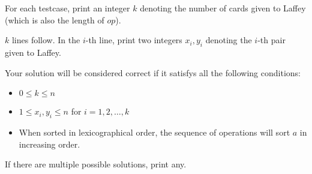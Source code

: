 For each testcase, print an integer $k$ denoting the number of cards given to Laffey (which is also the length of $op$).

$k$ lines follow.
In the $i$-th line, print two integers $x_i,y_i$ denoting the $i$-th pair given to Laffey.

Your solution will be considered correct if it satisfys all the following conditions:
\begin{itemize}
    \item $0 \leq k \leq n$
    \item $1 \leq x_i,y_i \leq n$ for $i = 1,2,\ldots,k$
    \item When sorted in lexicographical order, the sequence of operations will sort $a$ in increasing order.
\end{itemize}
If there are multiple possible solutions, print any.